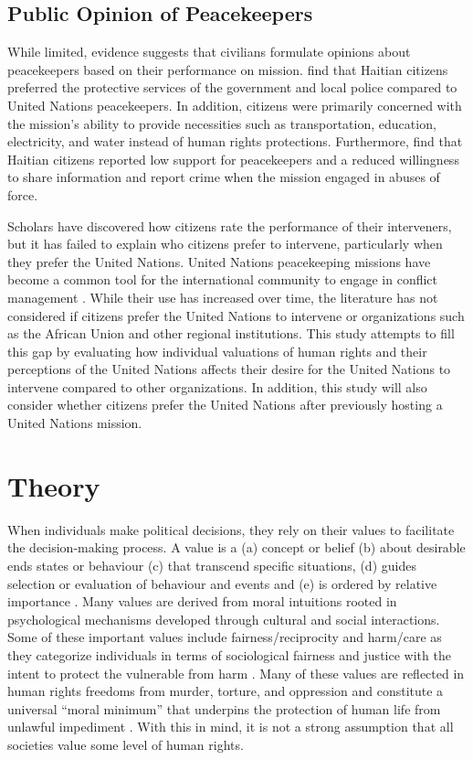 \documentclass[12pt]{article}
\newcommand{\UN}[1]{United Nations}
\begin{document}
\subsection*{Public Opinion of Peacekeepers}

While limited, evidence suggests that civilians formulate opinions about peacekeepers based on their performance on mission. \cite{mary2013peacekeepers} find that Haitian citizens preferred the protective services of the government and local police compared to \UN{} peacekeepers. In addition, citizens were primarily concerned with the mission's ability to provide necessities such as transportation, education, electricity, and water instead of human rights protections. Furthermore, \citep{gordon2017cooperation} find that Haitian citizens reported low support for peacekeepers and a reduced willingness to share information and report crime when the mission engaged in abuses of force.

Scholars have discovered how citizens rate the performance of their interveners, but it has failed to explain who citizens prefer to intervene, particularly when they prefer the \UN{}. United Nations peacekeeping missions have become a common tool for the international community to engage in conflict management \citep{UN_SC}. While their use has increased over time, the literature has not considered if citizens prefer the \UN{} to intervene or organizations such as the African Union and other regional institutions. This study attempts to fill this gap by evaluating how individual valuations of human rights and their perceptions of the United Nations affects their desire for the \UN{} to intervene compared to other organizations. In addition, this study will also consider whether citizens prefer the \UN{} after previously hosting a \UN{} mission. 

\section*{Theory}

When individuals make political decisions, they rely on their values to facilitate the decision-making process. A value is a (a) concept or belief (b) about desirable ends states or behaviour (c) that transcend specific situations, (d) guides selection or evaluation of behaviour and events and (e) is ordered by relative importance \citep{schwartz1987toward}. Many values are derived from moral intuitions rooted in psychological mechanisms developed through cultural and social interactions. Some of these important values include fairness/reciprocity and harm/care as they categorize individuals in terms of sociological fairness and justice with the intent to protect the vulnerable from harm \citep{graham2009liberals}. Many of these values are reflected in human rights freedoms from murder, torture, and oppression and constitute a universal ``moral minimum'' \citep{beitz2001human} that underpins the protection of human life from unlawful impediment \citep{hopgood2013,ignatieff2000human}. With this in mind, it is not a strong assumption that all societies value some level of human rights. 
\end{document}
